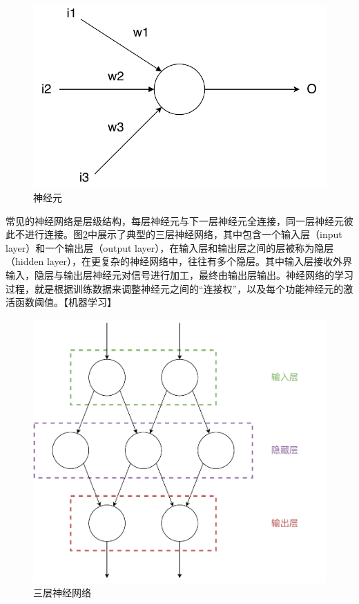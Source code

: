 \documentclass{cjc}
\begin{document}
\begin{figure}[htb]
  \centering
  \includegraphics[width=\linewidth]{neural.pdf}
  \caption{神经元}
  \label{neural}
\end{figure}

常见的神经网络是层级结构，每层神经元与下一层神经元全连接，同一层神经元彼此不进行连接。图\ref{nn}中展示了典型的三层神经网络，其中包含一个输入层（input layer）和一个输出层（output layer），在输入层和输出层之间的层被称为隐层（hidden layer），在更复杂的神经网络中，往往有多个隐层。其中输入层接收外界输入，隐层与输出层神经元对信号进行加工，最终由输出层输出。神经网络的学习过程，就是根据训练数据来调整神经元之间的“连接权”，以及每个功能神经元的激活函数阈值。【机器学习】


\begin{figure}[htb]
  \centering
  \includegraphics[width=\linewidth]{nn.pdf}
  \caption{三层神经网络}
  \label{nn}
\end{figure}
\end{document}
